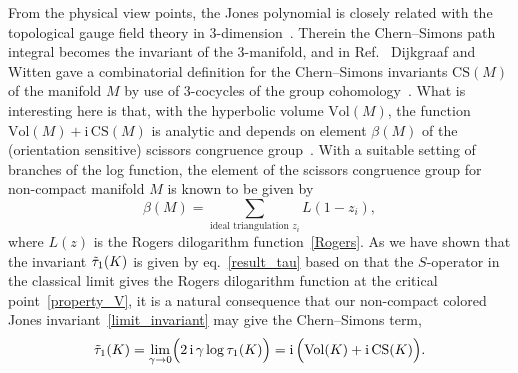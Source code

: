 \documentclass[12pt]{article}
\numberwithin{equation}{section}
\begin{document}
{}From the physical view points, the Jones polynomial
is closely related with the
topological gauge field theory in 3-dimension~\cite{EWitt89a}.
Therein the Chern--Simons path integral becomes the invariant of the
3-manifold, and in
Ref.~
Dijkgraaf and Witten gave a combinatorial definition
for the Chern--Simons invariants $\mathrm{CS}(M)$
of the manifold $M$
by use of 3-cocycles of the group
cohomology~\cite{DijkWitt90b}.
What is interesting here is that,
with  the hyperbolic volume $\mathrm{Vol}(M)$,
the function
$\mathrm{Vol}(M) + \mathrm{i} \, \mathrm{CS}(M)$
is analytic and depends on
element $\beta(M)$ of  the  (orientation sensitive) scissors congruence
group~\cite{NeumZagi85a,TYoshi85a}.
With  a suitable setting of   branches of the log
function,
the element of the  scissors congruence group  for non-compact
manifold $M$ is known
to be given by~\cite{NeumYang95b}
\begin{equation}
  \beta(M)
  =
  \sum_{
    \text{ideal triangulation $z_i$}
    }
  L(1 - z_i) ,
\end{equation}
where
$L(z)$ is the Rogers dilogarithm function~\eqref{Rogers}.
As we have shown that
the invariant $\Tilde{\tau}_1(K)$ is given by eq.~\eqref{result_tau}
based on that
the $S$-operator in the classical  limit gives the Rogers dilogarithm
function at the critical  point~\eqref{property_V},
it is   a natural consequence that our non-compact colored Jones
invariant~\eqref{limit_invariant} may
give the Chern--Simons term,
\begin{equation}
  \Tilde{\tau}_1(K)
  =
  \lim_{\gamma \to 0}
  \Bigl(
  2 \, \mathrm{i} \,  \gamma
  \log \tau_1(K)
  \Bigr) 
  =
  \mathrm{i} \,
  \Bigl(
  \mathrm{Vol}(K)
  + 
  \mathrm{i} \, \mathrm{CS}(K)
  \Bigr) .
\end{equation}



\end{document}
